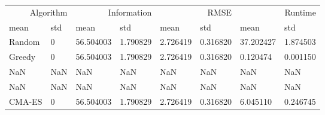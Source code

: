 \begin{tabular}{llllllll}
\toprule
\multicolumn{2}{r}{Algorithm} & \multicolumn{2}{r}{Information} & \multicolumn{2}{r}{RMSE} & \multicolumn{2}{r}{Runtime} \\
mean & std & mean & std & mean & std & mean & std \\
\midrule
Random & 0 & 56.504003 & 1.790829 & 2.726419 & 0.316820 & 37.202427 & 1.874503 \\
Greedy & 0 & 56.504003 & 1.790829 & 2.726419 & 0.316820 & 0.120474 & 0.001150 \\
NaN & NaN & NaN & NaN & NaN & NaN & NaN & NaN \\
NaN & NaN & NaN & NaN & NaN & NaN & NaN & NaN \\
CMA-ES & 0 & 56.504003 & 1.790829 & 2.726419 & 0.316820 & 6.045110 & 0.246745 \\
\bottomrule
\end{tabular}

